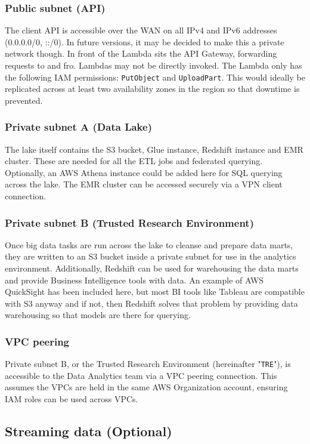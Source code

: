 \documentclass[10pt]{article}
\begin{document}
\subsubsection{Public subnet (API)}
The client API is accessible over the WAN on all IPv4 and IPv6 addresses (0.0.0.0/0, ::/0). In future versions, it may be decided to make this a private network though. In front of the Lambda sits the API Gateway, forwarding requests to and fro. Lambdas may not be directly invoked. The Lambda only has the following IAM permissions: \texttt{PutObject} and \texttt{UploadPart}. This would ideally be replicated across at least two availability zones in the region so that downtime is prevented.
\subsubsection{Private subnet A (Data Lake)}
The lake itself contains the S3 bucket, Glue instance, Redshift instance and EMR cluster. These are needed for all the ETL jobs and federated querying. Optionally, an AWS Athena instance could be added here for SQL querying across the lake. The EMR cluster can be accessed securely via a VPN client connection.
\subsubsection{Private subnet B (Trusted Research Environment)}
Once big data tasks are run across the lake to cleanse and prepare data marts, they are written to an S3 bucket inside a private subnet for use in the analytics environment. Additionally, Redshift can be used for warehousing the data marts and provide Business Intelligence tools with data. An example of AWS QuickSight has been included here, but most BI tools like Tableau are compatible with S3 anyway and if not, then Redshift solves that problem by providing data warehousing so that models are there for querying.
\subsubsection{VPC peering}
Private subnet B, or the Trusted Research Environment (hereinafter "\texttt{TRE}"), is accessible to the Data Analytics team via a VPC peering connection. This assumes the VPCs are held in the same AWS Organization account, ensuring IAM roles can be used across VPCs.

\subsection{Streaming data (Optional)}
\end{document}
